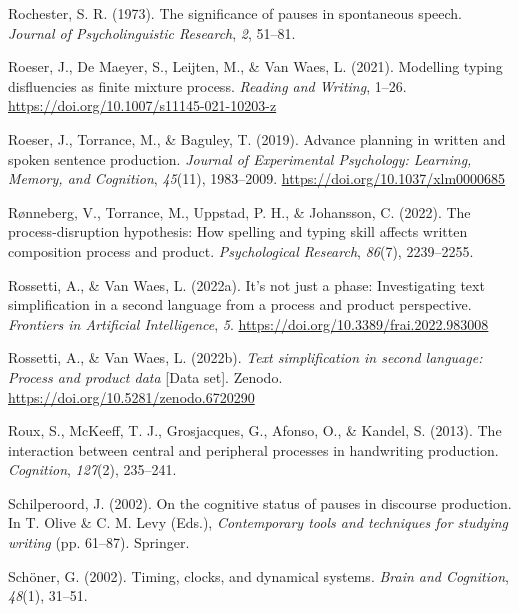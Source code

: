 \documentclass[
  man,floatsintext]{apa7}
\newlength{\cslhangindent}
\newlength{\cslentryspacingunit} %
\newenvironment{CSLReferences}[2] %
 {%
  \setlength{\parindent}{0pt}
  \ifodd #1
  \let\oldpar\par
  \def\par{\hangindent=\cslhangindent\oldpar}
  \fi
  \setlength{\parskip}{#2\cslentryspacingunit}
 }%
 {}
\begin{document}
\begin{CSLReferences}{1}{0}
\leavevmode{}%
Rochester, S. R. (1973). The significance of pauses in spontaneous speech. \emph{Journal of Psycholinguistic Research}, \emph{2}, 51--81.

\leavevmode{}%
Roeser, J., De Maeyer, S., Leijten, M., \& Van Waes, L. (2021). Modelling typing disfluencies as finite mixture process. \emph{Reading and Writing}, 1--26. \url{https://doi.org/10.1007/s11145-021-10203-z}

\leavevmode{}%
Roeser, J., Torrance, M., \& Baguley, T. (2019). Advance planning in written and spoken sentence production. \emph{Journal of Experimental Psychology: Learning, Memory, and Cognition}, \emph{45}(11), 1983--2009. \url{https://doi.org/10.1037/xlm0000685}

\leavevmode{}%
Rønneberg, V., Torrance, M., Uppstad, P. H., \& Johansson, C. (2022). The process-disruption hypothesis: How spelling and typing skill affects written composition process and product. \emph{Psychological Research}, \emph{86}(7), 2239--2255.

\leavevmode{}%
Rossetti, A., \& Van Waes, L. (2022a). It's not just a phase: Investigating text simplification in a second language from a process and product perspective. \emph{Frontiers in Artificial Intelligence}, \emph{5}. \url{https://doi.org/10.3389/frai.2022.983008}

\leavevmode{}%
Rossetti, A., \& Van Waes, L. (2022b). \emph{Text simplification in second language: Process and product data} {[}Data set{]}. Zenodo. \url{https://doi.org/10.5281/zenodo.6720290}

\leavevmode{}%
Roux, S., McKeeff, T. J., Grosjacques, G., Afonso, O., \& Kandel, S. (2013). The interaction between central and peripheral processes in handwriting production. \emph{Cognition}, \emph{127}(2), 235--241.

\leavevmode{}%
Schilperoord, J. (2002). On the cognitive status of pauses in discourse production. In T. Olive \& C. M. Levy (Eds.), \emph{Contemporary tools and techniques for studying writing} (pp. 61--87). Springer.

\leavevmode{}%
Schöner, G. (2002). Timing, clocks, and dynamical systems. \emph{Brain and Cognition}, \emph{48}(1), 31--51.


\end{CSLReferences}
\end{document}
